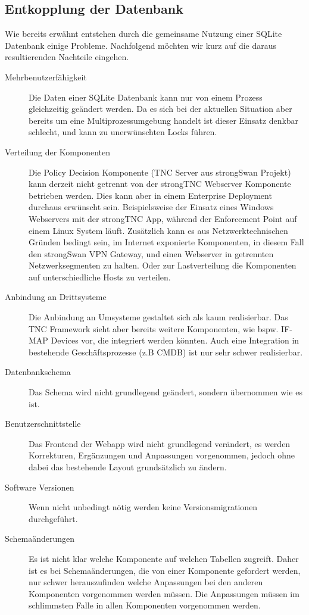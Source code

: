 \subsection{Entkopplung der Datenbank} Wie bereits erwähnt entstehen durch die
gemeinsame Nutzung einer SQLite Datenbank einige Probleme. Nachfolgend möchten wir kurz auf die daraus resultierenden Nachteile eingehen.
\begin{description}
\item[Mehrbenutzerfähigkeit]
Die Daten einer SQLite Datenbank kann nur von einem Prozess gleichzeitig geändert werden.
Da es sich bei der aktuellen Situation aber bereits um eine Multiprozessumgebung handelt ist dieser Einsatz denkbar schlecht, und kann zu unerwünschten Locks führen.

\item[Verteilung der Komponenten] Die Policy Decision Komponente (TNC Server aus
strongSwan Projekt) kann derzeit nicht getrennt von der strongTNC Webserver
Komponente betrieben werden. Dies kann aber in einem Enterprise Deployment
durchaus erwünscht sein. Beispielsweise der Einsatz eines Windows Webservers mit der strongTNC App, während der Enforcement Point auf einem Linux System läuft. Zusätzlich kann es aus Netzwerktechnischen Gründen bedingt sein, im Internet exponierte Komponenten, in diesem Fall den strongSwan VPN Gateway, und einen Webserver in getrennten Netzwerksegmenten zu halten. Oder zur Lastverteilung die Komponenten auf unterschiedliche Hosts zu verteilen.

\item[Anbindung an Drittsysteme]
Die Anbindung an Umsysteme gestaltet sich als kaum realisierbar. Das TNC Framework sieht aber bereits weitere Komponenten, wie bspw. IF-MAP Devices vor, die integriert werden könnten. Auch eine Integration in bestehende Geschäftsprozesse (z.B CMDB) ist nur sehr schwer realisierbar.
\end{description} 

\begin{description}

	\item[Datenbankschema] Das Schema wird nicht grundlegend
	geändert, sondern übernommen wie es ist.

	\item[Benutzerschnittstelle] Das Frontend der Webapp wird nicht grundlegend
	verändert, es werden Korrekturen, Ergänzungen und Anpassungen vorgenommen,
	jedoch ohne dabei das bestehende Layout grundsätzlich zu ändern.

	\item[Software Versionen] Wenn nicht unbedingt nötig werden keine
	Versionsmigrationen durchgeführt.

	\item[Schemaänderungen] Es ist nicht klar welche Komponente auf welchen
	Tabellen zugreift. Daher ist es bei Schemaänderungen, die von einer Komponente
	gefordert werden, nur schwer herauszufinden welche Anpassungen bei den anderen
	Komponenten vorgenommen werden müssen. Die Anpassungen müssen im schlimmsten
	Falle in allen Komponenten vorgenommen werden.
\end{description}

